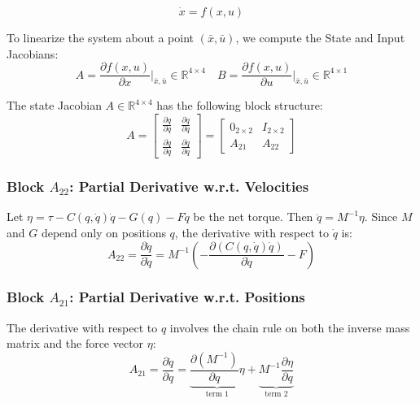 \begin{equation*}
    \dot{x} = f(x, u)
\end{equation*}

To linearize the system about a point $(\bar{x}, \bar{u})$, we compute the State and Input Jacobians:
\begin{equation*}
    A = \frac{\partial f(x,u)}{\partial x}\bigg|_{\bar{x}, \bar{u}}\in \mathbb{R}^{4\times 4} \quad B = \frac{\partial f(x,u)}{\partial u}\bigg|_{\bar{x}, \bar{u}} \in \mathbb{R}^{4\times 1}
\end{equation*}

The state Jacobian $A \in \mathbb{R}^{4 \times 4}$ has the following block structure:
\begin{equation}
    A = 
    \begin{bmatrix}
        \frac{\partial \dot{q}}{\partial q} & \frac{\partial \dot{q}}{\partial \dot{q}} \\
        \frac{\partial \ddot{q}}{\partial q} & \frac{\partial \ddot{q}}{\partial \dot{q}}
    \end{bmatrix}
    =
    \begin{bmatrix}
        0_{2 \times 2} & I_{2 \times 2} \\
        A_{21} & A_{22}
    \end{bmatrix}
\end{equation}

\subsubsection{Block \texorpdfstring{$A_{22}$}{A22}: Partial Derivative w.r.t. Velocities}
Let $\eta = \tau - C(q, \dot{q})\dot{q} - G(q) - F\dot{q}$ be the net torque. Then $\ddot{q} = M^{-1}\eta$. Since $M$ and $G$ depend only on positions $q$, the derivative with respect to $\dot{q}$ is:
\begin{equation}
    A_{22} = \frac{\partial \ddot{q}}{\partial \dot{q}} = M^{-1} \left( - \frac{\partial (C(q, \dot{q})\dot{q})}{\partial \dot{q}} - F \right)
\end{equation}


\subsubsection{Block \texorpdfstring{$A_{21}$}{A21}: Partial Derivative w.r.t. Positions}
The derivative with respect to $q$ involves the chain rule on both the inverse mass matrix and the force vector $\eta$:
\begin{equation}
    A_{21} = \frac{\partial \ddot{q}}{\partial q} = \underbrace{\frac{\partial (M^{-1})}{\partial q} \eta}_{\text{term 1}} + \underbrace{M^{-1} \frac{\partial \eta}{\partial q}}_{\text{term 2}}
\end{equation}

